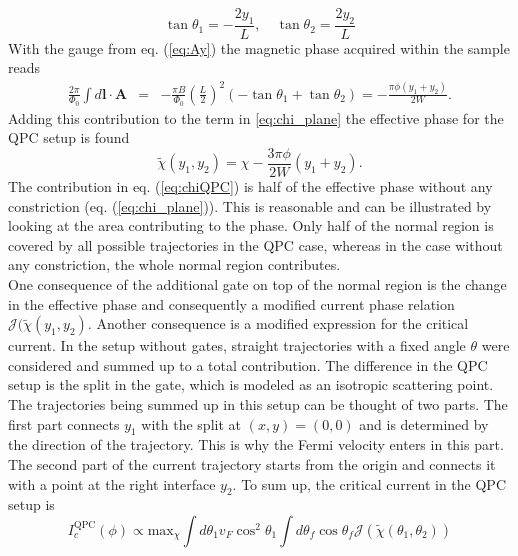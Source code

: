\begin{equation}
\tan \theta_1 = - \frac{2 y_1}{L}, \quad \tan \theta_2 = \frac{2 y_2}{L}
\label{eq:QPCparametrization}
\end{equation}
With the gauge from eq. (\ref{eq:Ay}) the magnetic phase acquired within the sample reads
\begin{eqnarray}
\frac{2\pi}{\Phi_0} \int d\mathbf{l} \cdot \mathbf{A}  &=&
-\frac{\pi B}{\Phi_0}\left(\frac{L}{2}\right)^2
\left(-\tan\theta_1 + \tan\theta_2\right) =
-\frac{\pi \phi (y_1+y_2)}{2 W}.
\label{eq:phaseQPC}
\end{eqnarray}
Adding this contribution to the term in \ref{eq:chi_plane} the effective phase for the QPC setup is found
\begin{equation}
\tilde{\chi}(y_1,y_2)=\chi-\frac{3 \pi \phi }{2W}(y_1+y_2).
\label{eq:chiQPC}
\end{equation}
The contribution in eq. (\ref{eq:chiQPC}) is half of the effective phase without any constriction (eq. (\ref{eq:chi_plane})). This is reasonable and can be illustrated by looking at the area contributing to the phase. Only half of the normal region is covered by all possible trajectories in the QPC case, whereas in the case without any constriction, the whole normal region contributes.\\
One consequence of the additional gate on top of the normal region is the change in the effective phase and consequently a modified current phase relation $\mathcal{J}(\tilde{\chi}(y_1, y_2)$. Another consequence is a modified expression for the critical current. In the setup without gates, straight trajectories with a fixed angle $\theta$ were considered and summed up to a total contribution. The difference in the QPC setup is the split in the gate, which is modeled as an isotropic scattering point. The trajectories being summed up in this setup can be thought of two parts. The first part connects $y_1$ with the split at $(x, y) = (0, 0)$ and is determined by the direction of the trajectory. This is why the Fermi velocity enters in this part. The second part of the current trajectory starts from the origin and connects it with a point at the right interface $y_2$. To sum up, the  critical current in the QPC setup is
\begin{equation}
I_c^{\text{QPC}}(\phi) \propto \text{max}_{\chi} \int d \theta_1 v_F \cos^2 \theta_1 \int d \theta_f \cos \theta_f \mathcal{J}\left( \tilde{\chi} (\theta_1, \theta_2) \right)
\end{equation}
